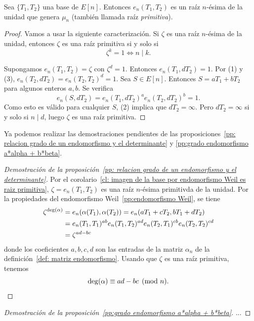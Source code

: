 
\begin{corolario}\label{cl: imagen de la base por endomorfismo Weil es raiz primitiva}
	Sea $\{ T_1, T_2 \}$ una base de $E[n]$. Entonces $e_n(T_1, T_2)$ es un raíz $n$-ésima de la unidad que genera $\mu_n$ (también llamada raíz \emph{primitiva}).
\end{corolario}
\begin{proof}
Vamos a usar la siguiente caracterización. Si $\zeta$ es una raíz $n$-ésima de la unidad, entonces $\zeta$ es una raíz primitiva si y solo si
$$
	\zeta^k = 1 \iff n \mid k.
$$

Supongamos $e_n(T_1, T_2) = \zeta$ con $\zeta ^ d = 1$. Entonces $e_n(T_1, d T_2) = 1$. Por (1) y (3), $e_n(T_2, d T_2) = e_n(T_2, T_2)^d = 1$. Sea $S \in E[n]$. Entonces $S = a T_1 + b T_2$ para algunos enteros $a, b$. Se verifica
$$
	e_n(S, d T_2) = e_n(T_1, d T_2)^a e_n(T_2, d T_2)^b = 1.
$$
Como esto es válido para cualquier $S$, (2) implica que $d T_2 = \infty$. Pero $d T_2 = \infty$ si y solo si $n \mid d$, luego $\zeta$ es una raíz primitiva.
\end{proof}

Ya podemos realizar las demostraciones pendientes de las proposiciones~\ref{pp: relacion grado de un endomorfismo y el determinante} y \ref{pp:grado endomorfismo a*alpha + b*beta}.

\begin{proof}[Demostración de la proposición~\ref{pp: relacion grado de un endomorfismo y el determinante}]
Por el corolario~\ref{cl: imagen de la base por endomorfismo Weil es raiz primitiva}, $\zeta = e_n(T_1, T_2)$ es una raíz $n$-ésima primitivda de la unidad. Por la propiedades del endomorfismo Weil~\ref{pp:endomorfismo Weil}, se tiene
\begin{align*}
	\zeta^{\deg(\alpha)} &= e_n(\alpha(T_1),\alpha(T_2)) = e_n(a T_1 + c T_2, b T_1 + d T_2) \\
		&= e_n(T_1, T_1)^{a b} e_n(T_1, T_2)^{a d} e_n(T_2, T_1)^{c b} e_n(T_2, T_2)^{c d} \\
		&= \zeta^{a d - b c}
\end{align*}
donde los coeficientes $a, b, c, d$ son las entradas de la matriz $\alpha_n$ de la definición~\ref{def: matriz endomorfismo}. Usando que $\zeta$ es una raíz primitiva, tenemos
$$
	\deg(\alpha) \equiv a d - b c \pmod{n}.
$$
\end{proof}

\begin{proof}[Demostración de la proposición~\ref{pp:grado endomorfismo a*alpha + b*beta}]
...
\end{proof}
